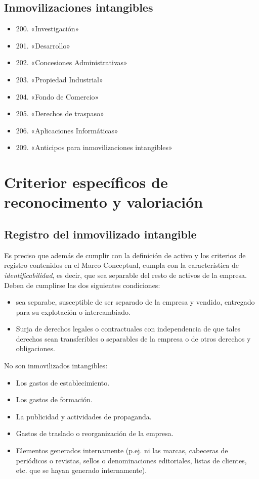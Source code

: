\documentclass[a4paper,12pt]{article}
\begin{document}
\subsection{Inmovilizaciones intangibles}
\begin{itemize}
        \item 200. «Investigación»
        \item 201. «Desarrollo»
        \item 202. «Concesiones Administrativas»
        \item 203. «Propiedad Industrial»
        \item 204. «Fondo de Comercio»
        \item 205. «Derechos de traspaso»
        \item 206. «Aplicaciones Informáticas»
        \item 209. «Anticipos para inmovilizaciones intangibles»
\end{itemize}

\section{Criterior específicos de reconocimento y valoriación}
\subsection{Registro del inmovilizado intangible}
Es preciso que además de cumplir con la definición de activo y los criterios de registro contenidos en el Marco Conceptual, cumpla con la característica de \textit{identificabilidad}, es decir, que sea separable del resto de activos de la empresa.\\

Deben de cumplirse las dos siguientes condiciones:
\begin{itemize}
    \item sea separabe, susceptible de ser separado de la empresa y vendido, entregado para su explotación o intercambiado.
    \item Surja de derechos legales o contractuales con independencia de que tales derechos sean  transferibles o separables de la empresa o de otros derechos y obligaciones.
\end{itemize}

No son inmovilizados intangibles:
\begin{itemize}
    \item Los gastos de establecimiento.
    \item Los gastos de formación.
    \item La publicidad y actividades de propaganda.
    \item Gastos de traslado o reorganización de la empresa.
    \item Elementos generados internamente (p.ej. ni las marcas, cabeceras de periódicos o revistas, sellos o denominaciones editoriales, listas de clientes, etc. que se hayan generado internamente).
\end{itemize}
\end{document}
